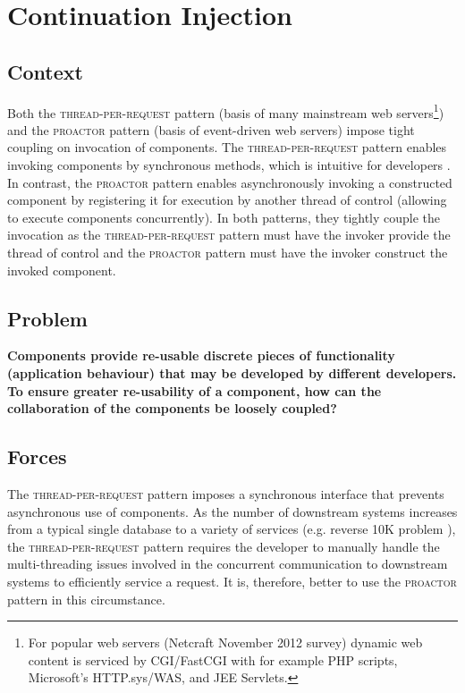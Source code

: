 \documentclass[prodmode]{style/acmlarge}
\begin{document}
\section{Continuation Injection}


\subsection{Context}

Both the \textsc{thread-per-request} pattern \cite{thread-per-request} (basis of
many mainstream web servers\footnote{For popular web servers (Netcraft November
2012 survey) dynamic web content is serviced by CGI/FastCGI with for example PHP
scripts, Microsoft's HTTP.sys/WAS, and JEE Servlets.}) and the \textsc{proactor}
pattern \cite{proactor} (basis of event-driven web servers) impose tight
coupling on invocation of components.  The \textsc{thread-per-request} pattern
enables invoking components by synchronous methods, which is intuitive for
developers \cite[p. 2]{proactor}.  In contrast, the \textsc{proactor} pattern
enables asynchronously invoking a constructed component by registering it for
execution by another thread of control (allowing to execute components
concurrently).  In both patterns, they tightly couple the invocation as the
\textsc{thread-per-request} pattern must have the invoker provide the thread of
control and the \textsc{proactor} pattern must have the invoker construct the
invoked component.


\subsection{Problem}

\textbf{Components provide re-usable discrete pieces of functionality
(application behaviour) that may be developed by different developers.  To
ensure greater re-usability of a component, how can the collaboration of the
components be loosely coupled?}


\subsection{Forces}

The \textsc{thread-per-request} pattern imposes a synchronous interface that
prevents asynchronous use of components.  As the number of downstream systems
increases from a typical single database to a variety of services (e.g.
reverse 10K problem \cite{reverse-ten-k-problem}), the
\textsc{thread-per-request} pattern requires the developer to manually handle
the multi-threading issues involved in the concurrent communication to
downstream systems to efficiently service a request.  It is, therefore, better
to use the \textsc{proactor} pattern in this circumstance.
\end{document}
